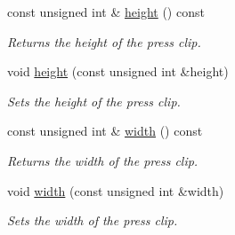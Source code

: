 \begin{CompactItemize}
const unsigned int \& \hyperlink{class_clip_location_e18ec2c31e76a983acdbaec9d3bad659}{height} () const 
\begin{CompactList}\small\item\em Returns the height of the press clip. \item\end{CompactList}\item 
void \hyperlink{class_clip_location_f0e979e989c1cecbca6fe2da92b383f7}{height} (const unsigned int \&height)
\begin{CompactList}\small\item\em Sets the height of the press clip. \item\end{CompactList}\item 
const unsigned int \& \hyperlink{class_clip_location_e48a4531c0473ec63dbc992e866a50e7}{width} () const 
\begin{CompactList}\small\item\em Returns the width of the press clip. \item\end{CompactList}\item 
void \hyperlink{class_clip_location_7dc15a35acc1594dfc1e5f64ca33d3b9}{width} (const unsigned int \&width)
\begin{CompactList}\small\item\em Sets the width of the press clip. \item\end{CompactList}\end{CompactItemize}
